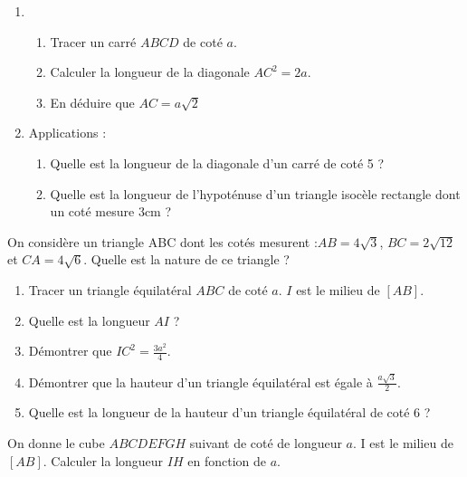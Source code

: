  

 

 


\begin{enumerate}
\item
\begin{enumerate}
\item Tracer un carré $ABCD$ de coté $a$.  
\item Calculer la longueur de la diagonale $AC^2=2a$.
\item En déduire que $AC=a\sqrt{2}$
\end{enumerate}
\item
Applications : 
\begin{enumerate}
\item Quelle est la longueur de la diagonale d'un carré de coté 5 ?
\item Quelle est la longueur de l'hypoténuse d'un triangle isocèle rectangle dont un coté mesure 3cm ?
\end{enumerate}
\end{enumerate}




On considère un triangle ABC dont les cotés mesurent :$AB = 4\sqrt{3}$, $BC = 2\sqrt{12}$ et $CA= 4\sqrt{6}$. Quelle est la nature de ce triangle ?







\begin{enumerate}
\item Tracer un triangle équilatéral $ABC$ de coté $a$. $I$ est le milieu de $[AB]$. 
\item Quelle est la longueur $AI$ ?
\item Démontrer que $IC^2=\frac{3a^2}{4}$.
\item Démontrer que la hauteur d'un triangle équilatéral est égale à $\frac{a\sqrt3}{2}$.
\item Quelle est la longueur de la hauteur d'un triangle équilatéral de coté 6 ?
\end{enumerate}




 
On donne le cube $ABCDEFGH$ suivant de coté de longueur $a$. I est le milieu de $[AB]$. Calculer la longueur $IH$ en fonction de $a$.

